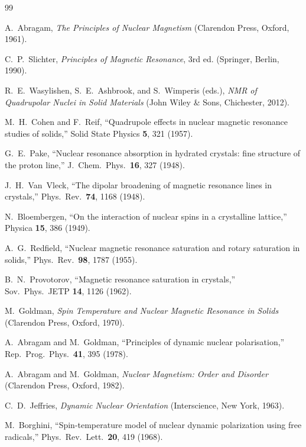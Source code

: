 \documentclass[11pt]{article}
\begin{document}
\begin{thebibliography}{99}

A.~Abragam, \emph{The Principles of Nuclear Magnetism} (Clarendon Press, Oxford, 1961).

C.~P.~Slichter, \emph{Principles of Magnetic Resonance}, 3rd ed. (Springer, Berlin, 1990).

R.~E.~Wasylishen, S.~E.~Ashbrook, and S.~Wimperis (eds.), \emph{NMR of Quadrupolar Nuclei in
Solid Materials} (John Wiley \& Sons, Chichester, 2012).

M.~H.~Cohen and F.~Reif, ``Quadrupole effects in nuclear magnetic resonance studies of
solids,'' Solid State Physics \textbf{5}, 321 (1957).

G.~E.~Pake, ``Nuclear resonance absorption in hydrated crystals: fine structure of the proton
line,'' J.\ Chem.\ Phys.\ \textbf{16}, 327 (1948).

J.~H.~Van~Vleck, ``The dipolar broadening of magnetic resonance lines in crystals,''
Phys.\ Rev.\ \textbf{74}, 1168 (1948).

N.~Bloembergen, ``On the interaction of nuclear spins in a crystalline lattice,''
Physica \textbf{15}, 386 (1949).

A.~G.~Redfield, ``Nuclear magnetic resonance saturation and rotary saturation in solids,''
Phys.\ Rev.\ \textbf{98}, 1787 (1955).

B.~N.~Provotorov, ``Magnetic resonance saturation in crystals,'' Sov.\ Phys.\ JETP
\textbf{14}, 1126 (1962).

M.~Goldman, \emph{Spin Temperature and Nuclear Magnetic Resonance in Solids} (Clarendon Press,
Oxford, 1970).

A.~Abragam and M.~Goldman, ``Principles of dynamic nuclear polarisation,'' Rep.\ Prog.\ Phys.\
\textbf{41}, 395 (1978).

A.~Abragam and M.~Goldman, \emph{Nuclear Magnetism: Order and Disorder} (Clarendon Press,
Oxford, 1982).

C.~D.~Jeffries, \emph{Dynamic Nuclear Orientation} (Interscience, New York, 1963).

M.~Borghini, ``Spin-temperature model of nuclear dynamic polarization using free radicals,''
Phys.\ Rev.\ Lett.\ \textbf{20}, 419 (1968).


\end{thebibliography}
\end{document}
